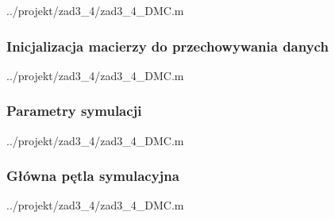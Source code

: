 \ifdefined\CompileListings
    
        {../projekt/zad3_4/zad3_4_DMC.m}
    \newpage
\fi

\subsubsection{Inicjalizacja macierzy do przechowywania danych}

\ifdefined\CompileListings
    
        {../projekt/zad3_4/zad3_4_DMC.m}
\fi

\subsubsection{Parametry symulacji}

\ifdefined\CompileListings
    
        {../projekt/zad3_4/zad3_4_DMC.m}
    \newpage
\fi

\subsubsection{Główna pętla symulacyjna}

\ifdefined\CompileListings
    
        {../projekt/zad3_4/zad3_4_DMC.m}
\fi


\newpage
